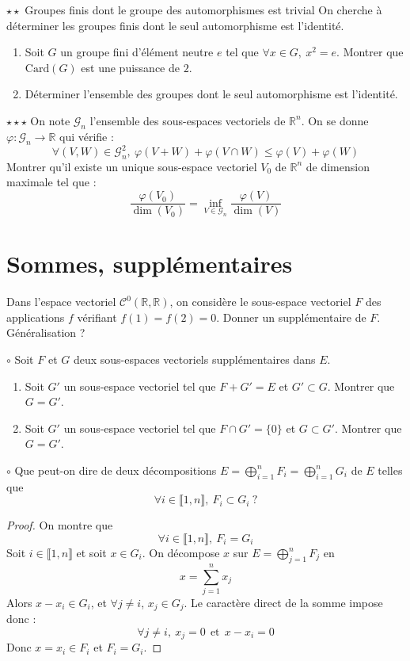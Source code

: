 \documentclass[french,a4paper]{article}
\newcommand{\R}{\mathbb{R}}
\newcommand{\card}{\text{Card}}
\theoremstyle{plain}
\theoremstyle{definition}
\theoremstyle{remark}
\begin{document}
\begin{ex}[Ulm]{$\star\star$ Groupes finis dont le groupe des automorphismes est trivial}
	On cherche à déterminer les groupes finis dont le seul automorphisme est l'identité.
	\begin{enumerate}
		\item Soit $G$ un groupe fini d'élément neutre $e$ tel que $\forall x\in G,\ x^2=e$. Montrer que $\card(G)$ est une puissance de $2$.
		\item Déterminer l'ensemble des groupes dont le seul automorphisme est l'identité.
	\end{enumerate}
\end{ex}

\begin{ex}[Ulm]{$\star\star\star$}
	On note $\mathcal{G}_n$ l'ensemble des sous-espaces vectoriels de $\R^n$. On se donne $\varphi:\mathcal{G}_n\to\R$ qui vérifie : $$\forall (V,W)\in\mathcal{G}_n^2,\ \varphi(V+W)+\varphi(V\cap W)\leqslant\varphi(V)+\varphi(W)$$ Montrer qu'il existe un unique sous-espace vectoriel $V_0$ de $\R^n$ de dimension maximale tel que : $$\frac{\varphi(V_0)}{\dim(V_0)}=\underset{V\in\mathcal{G}_n}{\inf}\frac{\varphi(V)}{\dim(V)}$$
\end{ex}

\section{Sommes, supplémentaires}

\begin{ex}[Moulin.EV.26]{}
	Dans l'espace vectoriel $\mathcal{C}^0(\R,\R)$, on considère le sous-espace vectoriel $F$ des applications $f$ vérifiant $f(1)=f(2)=0$. Donner un supplémentaire de $F$. Généralisation ?
\end{ex}

\begin{ex}[Moulin.EV.27]{$\circ$}
	Soit $F$ et $G$ deux sous-espaces vectoriels supplémentaires dans $E$.
	\begin{enumerate}
		\item Soit $G'$ un sous-espace vectoriel tel que $F+G'=E$ et $G'\subset G$. Montrer que $G=G'$.
		\item Soit $G'$ un sous-espace vectoriel tel que $F\cap G'=\{0\}$ et $G\subset G'$. Montrer que $G=G'$.
	\end{enumerate}
\end{ex}

\begin{ex}[Moulin.EV.28]{$\circ$}
	Que peut-on dire de deux décompositions $E=\displaystyle\bigoplus_{i=1}^nF_i=\bigoplus_{i=1}^n G_i$ de $E$ telles que $$\forall i\in\llbracket1,n\rrbracket,\ F_i\subset G_i\ ?$$
\end{ex}
\begin{proof}
	On montre que $$\forall i\in\llbracket1,n\rrbracket,\ F_i=G_i$$ Soit $i\in\llbracket1,n\rrbracket$ et soit $x\in G_i$. On décompose $x$ sur $E=\displaystyle\bigoplus_{j=1}^nF_j$ en $$x=\sum_{j=1}^{n}x_j$$ Alors $x-x_i\in G_i$, et $\forall j\ne i$, $x_j\in G_j$. Le caractère direct de la somme impose donc : $$\forall j\ne i,\ x_j=0\ \ \text{et}\ \ x-x_i=0$$ Donc $x=x_i\in F_i$ et $F_i=G_i$.
\end{proof}
\end{document}
